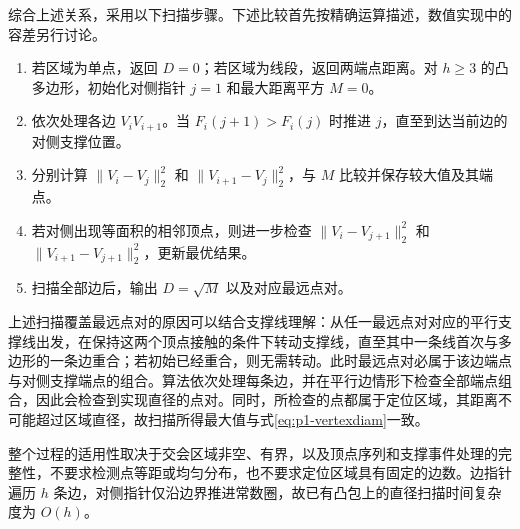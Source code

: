 综合上述关系，采用以下扫描步骤。下述比较首先按精确运算描述，数值实现中的容差另行讨论。
\begin{enumerate}[label=\arabic*)]
    \item 若区域为单点，返回 $D=0$；若区域为线段，返回两端点距离。对 $h\ge3$ 的凸多边形，初始化对侧指针 $j=1$ 和最大距离平方 $M=0$。
    \item 依次处理各边 $V_iV_{i+1}$。当 $F_i(j+1)>F_i(j)$ 时推进 $j$，直至到达当前边的对侧支撑位置。
    \item 分别计算 $\|V_i-V_j\|_2^2$ 和 $\|V_{i+1}-V_j\|_2^2$，与 $M$ 比较并保存较大值及其端点。
    \item 若对侧出现等面积的相邻顶点，则进一步检查 $\|V_i-V_{j+1}\|_2^2$ 和 $\|V_{i+1}-V_{j+1}\|_2^2$，更新最优结果。
    \item 扫描全部边后，输出 $D=\sqrt M$ 以及对应最远点对。
\end{enumerate}

上述扫描覆盖最远点对的原因可以结合支撑线理解：从任一最远点对对应的平行支撑线出发，在保持这两个顶点接触的条件下转动支撑线，直至其中一条线首次与多边形的一条边重合；若初始已经重合，则无需转动。此时最远点对必属于该边端点与对侧支撑端点的组合。算法依次处理每条边，并在平行边情形下检查全部端点组合，因此会检查到实现直径的点对。同时，所检查的点都属于定位区域，其距离不可能超过区域直径，故扫描所得最大值与式\eqref{eq:p1-vertexdiam}一致。

整个过程的适用性取决于交会区域非空、有界，以及顶点序列和支撑事件处理的完整性，不要求检测点等距或均匀分布，也不要求定位区域具有固定的边数。边指针遍历 $h$ 条边，对侧指针仅沿边界推进常数圈，故已有凸包上的直径扫描时间复杂度为 $O(h)$。
